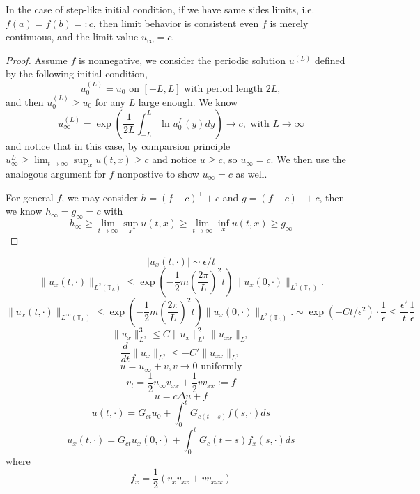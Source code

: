 \begin{theorem}
    In the case of step-like initial condition, if we have same sides limits, i.e. $ f(a) = f(b)=:c$,  then limit behavior is consistent even $f$ is merely continuous, and the limit value $u_{\infty} = c$.
\end{theorem}
\begin{proof}
    Assume $f$ is nonnegative, we consider the periodic solution $u^{(L)}$ defined by the following initial condition,
    \[
    u_0^{(L)} = u_0\text{ on }[-L,L]\text{ with period length }2L,
    \]
    and then $u_0^{(L)} \geq u_0$ for any $L$ large enough. We know
    \[
    u_{\infty}^{(L)} = \exp\left(\dfrac{1}{2L}\int^{L}_{-L} \ln u_0^L(y)dy\right) \to c,\text{ with }L\to\infty
    \]
    and notice that in this case, by comparsion principle $u_{\infty}^L \geq \lim_{t\to\infty}\sup_xu(t,x) \geq c$ and notice $u\geq c$, so $u_{\infty} = c$. We then use the analogous argument for $f$ nonpostive to show $u_{\infty} = c$ as well.
    
    For general $f$, we may consider $ h = (f-c)^++c $ and $g = (f-c)^-+c$, then we know $h_{\infty} = g_{\infty} = c$ with \[h_{\infty} \geq \lim_{t\to\infty}\sup_xu(t,x) \geq \lim_{t\to\infty}\inf_xu(t,x) \geq g_{\infty}\]
\end{proof}

\[
|u_x(t,\cdot)| \sim \epsilon/t
\]
\[
\boxed{
\|u_x(t,\cdot)\|_{L^2(\mathbb T_L)}
\le
\exp\left(
-\frac12 m\left(\frac{2\pi}{L}\right)^2t
\right)
\|u_x(0,\cdot)\|_{L^2(\mathbb T_L)}.
}
\]
\[
\|u_x(t,\cdot)\|_{L^{\infty}(\mathbb T_L)}
\le
\exp\left(
-\frac12 m\left(\frac{2\pi}{L}\right)^2t
\right)
\|u_x(0,\cdot)\|_{L^2(\mathbb T_L)}. \sim \exp( - Ct/\epsilon ^2) \cdot \dfrac1\epsilon \leq \dfrac{\epsilon^2}{t}\dfrac1\epsilon
\]
\[
\lVert u_x\rVert_{L^2}^3 \leq C \lVert u_x\rVert_{L^1}^2\lVert u_{xx}\rVert_{L^2}
\]
\[
\dfrac{d}{dt} \lVert u_x\rVert_{L^2} \leq - C' \lVert u_{xx}\rVert_{L^2} 
\]
\[
u = u_{\infty} + v, v\to 0 \text{ uniformly}
\]
\[
v_t = \dfrac12 u_{\infty}v_{xx}+\dfrac12 vv_{xx}:=f
\]
\[
u = c\Delta u + f
\]
\[
u(t,\cdot) = G_{ct}u_0 + \int_0^t G_{c(t-s)}f(s,\cdot)ds
\]
\[
u_x(t,\cdot) = G_{ct}u_x(0,\cdot) + \int_0^t G_c(t-s)f_x(s,\cdot) ds
\]
where
\[
f_x = \dfrac12 (v_xv_{xx} + vv_{xxx})
\]

